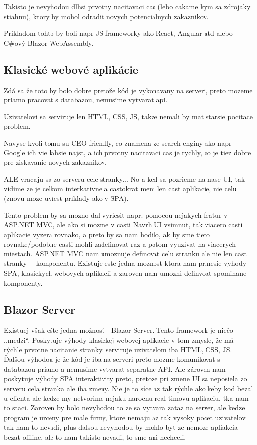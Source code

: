 Takisto je nevyhodou dlhsi prvotny nacitavaci cas (lebo cakame kym sa zdrojaky stiahnu), ktory by mohol odradit novych potencialnych zakaznikov.

Prikladom tohto by boli napr JS frameworky ako React, Angular atď alebo C\#ový Blazor WebAssembly.

\subsection{Klasické webové aplikácie}

Zdá sa že toto by bolo dobre pretože kód je vykonavany na serveri, preto mozeme priamo pracovat s databazou, nemusime vytvarat api.

Uzivatelovi sa serviruje len HTML, CSS, JS, takze nemali by mat starsie pocitace problem.

Navyse kvoli tomu su CEO friendly, co znamena ze search-enginy ako napr Google ich vie lahsie najst, a ich prvotny nacitavaci cas je rychly, co je tiez dobre pre ziskavanie novych zakaznikov.

ALE vracaju sa zo serveru cele stranky... No a ked sa pozrieme na nase UI, tak vidime ze je celkom interkativne a castokrat meni len cast aplikacie, nie celu (znovu moze uviest priklady ako v SPA).

Tento problem by sa mozno dal vyriesit napr. pomocou nejakych featur v ASP.NET MVC, ale ako si mozme v casti Navrh UI vsimnut, tak viacero casti aplikacie vyzera rovnako, a preto by sa nam hodilo, ak by sme tieto rovnake/podobne casti mohli zadefinovat raz a potom vyuzivat na viacerych miestach. ASP.NET MVC nam umoznuje definovat celu stranku ale nie len cast stranky~-- komponentu. Existuje este jedna moznost ktora nam prinesie vyhody SPA, klasickych webovych aplikacii a zaroven nam umozni definvoat spominane komponenty.

\subsection{Blazor Server}

Existuej však ešte jedna možnosť~--Blazor Server. Tento framework je niečo ,,medzi``. Poskytuje výhody klasickej webovej aplikacie v tom zmysle, že má rýchle prvotne nacitanie stranky, serviruje uzivatelom iba HTML, CSS, JS. Ďalšou výhodou je že kód je iba na serveri preto mozme komunikovat s databazou priamo a nemusime vytvarat separatne API. Ale zároven nam poskytuje výhody SPA interaktivity preto, pretoze pri zmene UI sa neposiela zo serveru cela stranka ale iba zmeny. Nie je to síce az tak rýchle ako keby kod bezal u clienta ale kedze my netvorime nejaku narocnu real timovu aplikaciu, tka nam to staci. Zaroven by bolo nevyhodou to ze sa vytvara zataz na server, ale kedze program je urceny pre male firmy, ktore nemaju az tak vysoky pocet uzivatelov tak nam to nevadi, plus dalsou nevyhodou by mohlo byt ze nemoze apliakcia bezat offline, ale to nam takisto nevadi, to sme ani nechceli.

